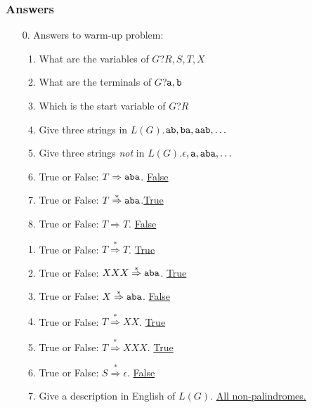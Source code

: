 \documentclass[11pt]{article}
\begin{document}
\subsubsection*{Answers}
\begin{enumerate}
\item[0.] Answers to warm-up problem:

\begin{minipage}{.5\linewidth}
\begin{enumerate}
\item What are the variables of $G$?\quad \underline{$R, S, T, X$}
\item What are the terminals of $G$?\quad \underline{${\tt a}, {\tt b}$}
\item Which is the start variable of $G$?\quad\underline{$R$}
\item Give three strings in $L(G)$.\quad\underline{${\tt ab}, {\tt ba}, {\tt aab},\ldots$}
\item Give three strings {\em not} in $L(G)$.\quad\underline{$\epsilon, {\tt a}, {\tt aba},\ldots$}
\item True or False: $T \Rightarrow {\tt aba}$. \quad \underline{False}
\item True or False: $T \stackrel{*}{\Rightarrow} {\tt aba}$.\quad \underline{True}
\item True or False: $T \Rightarrow T$. \quad \underline{False}
\setcounter{parts}{\value{enumii}}
\end{enumerate}
\end{minipage}
\begin{minipage}{.5\linewidth}
\begin{enumerate}
\setcounter{enumii}{\value{parts}}
\item True or False: $T \stackrel{*}{\Rightarrow} T$. \quad \underline{True}
\item True or False: $XXX \stackrel{*}{\Rightarrow} {\tt aba}$.  \quad \underline{True}
\item True or False: $X \stackrel{*}{\Rightarrow} {\tt aba}$. \quad \underline{False}
\item True or False: $T \stackrel{*}{\Rightarrow} XX$. \quad \underline{True}
\item True or False: $T \stackrel{*}{\Rightarrow} XXX$. \quad \underline{True}
\item True or False: $S \stackrel{*}{\Rightarrow} \epsilon$. \quad \underline{False}
\item Give a description in English of $L(G)$.
\underline{All non-palindromes.}
\end{enumerate}
\end{minipage}
\end{enumerate}
\end{document}
